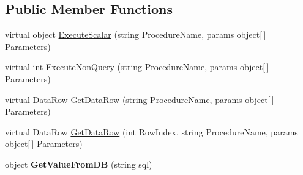 \subsection*{Public Member Functions}
\begin{DoxyCompactItemize}
\item 
virtual object \hyperlink{class_d_b_class_a3995c60b4a603b90560f5180ae929348}{Execute\-Scalar} (string Procedure\-Name, params object\mbox{[}$\,$\mbox{]} Parameters)
\item 
virtual int \hyperlink{class_d_b_class_a9fe3e632d65861059ff2f8eb6c266a7b}{Execute\-Non\-Query} (string Procedure\-Name, params object\mbox{[}$\,$\mbox{]} Parameters)
\item 
virtual Data\-Row \hyperlink{class_d_b_class_a3d3793d07d5bdfcb8e904f1272f1e314}{Get\-Data\-Row} (string Procedure\-Name, params object\mbox{[}$\,$\mbox{]} Parameters)
\item 
virtual Data\-Row \hyperlink{class_d_b_class_af7d28bb6d82d5ed48310a9807148afea}{Get\-Data\-Row} (int Row\-Index, string Procedure\-Name, params object\mbox{[}$\,$\mbox{]} Parameters)
\item 
\hypertarget{class_d_b_class_a103c8b1a6b0d077064d2bef4b3b76c6b}{object {\bfseries Get\-Value\-From\-D\-B} (string sql)}\label{class_d_b_class_a103c8b1a6b0d077064d2bef4b3b76c6b}


\end{DoxyCompactItemize}
